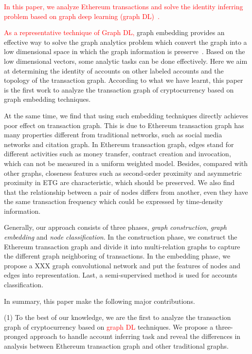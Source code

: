 \textcolor{red}{In this paper, we analyze Ethereum transactions and solve the identity inferring problem based on graph deep learning (graph DL)~\cite{battaglia2018relational}.}

\textcolor{red}{As a representative technique of Graph DL, }graph embedding provides an effective way to solve the graph analytics problem which convert the graph into a low dimensional space in which the graph information is preserve~\cite{cai2018comprehensive}. Based on the low dimensional vectors, some analytic tasks can be done effectively. Here we aim at determining the identity of accounts on other labeled accounts and the topology of the transaction graph. According to what we have learnt, this paper is the first work to analyze the transaction graph of cryptocurrency based on graph embedding techniques.

At the same time, we find that using such embedding techniques directly achieves poor effect on transaction graph. This is due to Ethereum transaction graph has many properties different from traditional networks, such as social media networks and citation graph. In Ethereum transaction graph, edges stand for different activities such as money transfer, contract creation and invocation, which can not be measured in a uniform weighted model. Besides, compared with other graphs, closeness features such as second-order proximity and asymmetric proximity in ETG are characteristic, which should be preserved. We also find that the relationship between a pair of nodes differs from another, even they have the same transaction frequency which could be expressed by time-density information.

Generally, our approach consists of three phases, \emph{graph construction}, \emph{graph embedding} and \emph{node classification}. In the construction phase, we construct the Ethereum transaction graph and divide it into multi-relation graphs to capture the different graph neighboring of transactions. In the embedding phase, we propose a XXX graph convolutional network and put the features of nodes and edges into representation. Last, a semi-supervised method is used for accounts classification.

In summary, this paper make the following major contributions.

(1) To the best of our knowledge, we are the first to analyze the transaction graph of cryptocurrency based on \textcolor{red}{graph DL} techniques. We propose a three-pronged approach to handle account inferring task and reveal the differences in analysis between Ethereum transaction graph and other traditional graphs.

